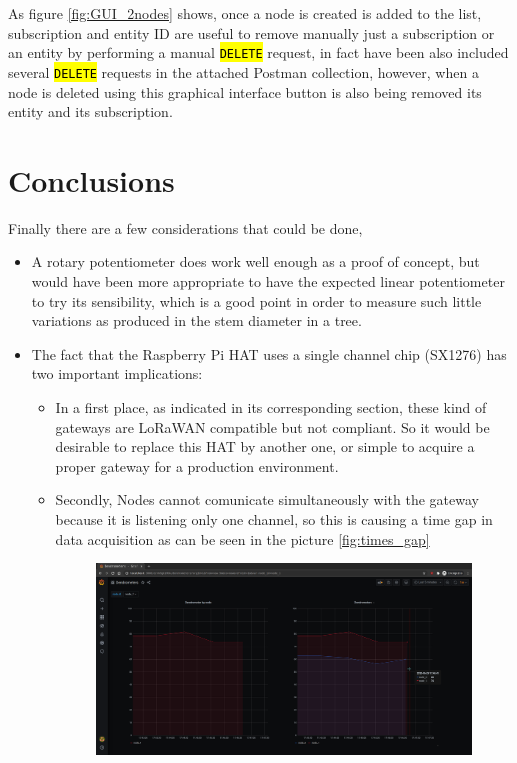 \documentclass[11pt,a4paper,dvipsnames,twoside]{article}
\newcommand{\cmd}[1] {\hl{\texttt{#1}}}
\begin{document}
As figure \ref{fig:GUI_2nodes} shows, once a node is created is added to the list, subscription and entity ID are useful to remove manually just a subscription or an entity by performing a manual \cmd{DELETE} request, in fact have been also included several \cmd{DELETE} requests in the attached Postman collection, however, when a node is deleted using this graphical interface button is also being removed its entity and its subscription.

\newpage
\section{Conclusions}
Finally there are a few considerations that could be done, 

\begin{itemize}
  \item A rotary potentiometer does work well enough as a proof of concept, but would have been more appropriate to have the expected linear potentiometer to try its sensibility, which is a good point in order to measure such little variations as produced in the stem diameter in a tree.
  \item The fact that the Raspberry Pi HAT uses a single channel chip (SX1276) has two important implications:
    \begin{itemize}
      \item In a first place, as indicated in its corresponding section, these kind of gateways are LoRaWAN compatible but not compliant. So it would be desirable to replace this HAT by another one, or simple to acquire a proper gateway for a production environment.
      \item Secondly, Nodes cannot comunicate simultaneously with the gateway because it is listening only one channel, so this is causing a time gap in data acquisition as can be seen in the picture \ref{fig:times_gap}
      \begin{figure}[ht]
        \centering
        \includegraphics[width=.9\textwidth]{../pictures/Grafana_times_gap.png}

\end{figure}
\end{itemize}
\end{itemize}
\end{document}
